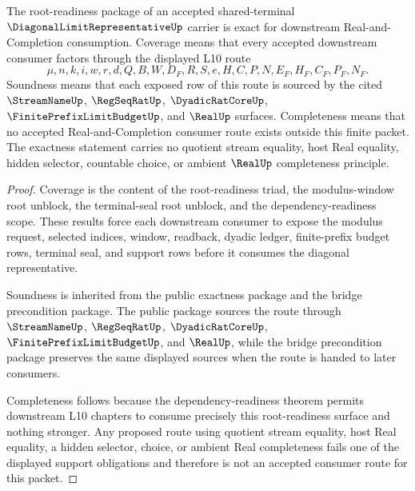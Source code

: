 \begin{theorem}
\label{thm:diagonal-limit-representative-root-readiness-exactness}
The root-readiness package of an accepted shared-terminal $\DiagonalLimitRepresentativeUp$ carrier is exact for downstream Real-and-Completion consumption. Coverage means that every accepted downstream consumer factors through the displayed L10 route
$$
\mu,n,k,i,w,r,d,Q,B,W,D_F,R,S,e,H,C,P,N,E_F,H_F,C_F,P_F,N_F.
$$
Soundness means that each exposed row of this route is sourced by the cited $\StreamNameUp$, $\RegSeqRatUp$, $\DyadicRatCoreUp$, $\FinitePrefixLimitBudgetUp$, and $\RealUp$ surfaces. Completeness means that no accepted Real-and-Completion consumer route exists outside this finite packet. The exactness statement carries no quotient stream equality, host Real equality, hidden selector, countable choice, or ambient $\RealUp$ completeness principle.
\end{theorem}
\begin{proof}
Coverage is the content of the root-readiness triad, the modulus-window root unblock, the terminal-seal root unblock, and the dependency-readiness scope. These results force each downstream consumer to expose the modulus request, selected indices, window, readback, dyadic ledger, finite-prefix budget rows, terminal seal, and support rows before it consumes the diagonal representative.

Soundness is inherited from the public exactness package and the bridge precondition package. The public package sources the route through $\StreamNameUp$, $\RegSeqRatUp$, $\DyadicRatCoreUp$, $\FinitePrefixLimitBudgetUp$, and $\RealUp$, while the bridge precondition package preserves the same displayed sources when the route is handed to later consumers.

Completeness follows because the dependency-readiness theorem permits downstream L10 chapters to consume precisely this root-readiness surface and nothing stronger. Any proposed route using quotient stream equality, host Real equality, a hidden selector, choice, or ambient Real completeness fails one of the displayed support obligations and therefore is not an accepted consumer route for this packet.
\end{proof}

